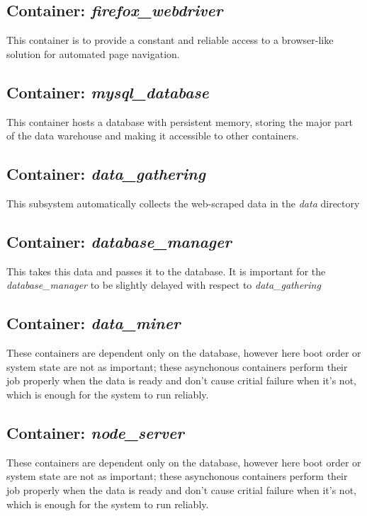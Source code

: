 \subsection{Container: \textit{firefox\_webdriver}}
This container is to provide a constant and reliable access to a browser-like solution for automated page navigation.

\subsection{Container: \textit{mysql\_database}}
This container hosts a database with persistent memory, storing the major part of the data warehouse and making it accessible to other containers.

\subsection{Container: \textit{data\_gathering}}
This subsystem automatically collects the web-scraped data in the \textit{data} directory

\subsection{Container: \textit{database\_manager}}
This takes this data and passes it to the database. It is important for the \textit{database\_manager} to be slightly delayed with respect to \textit{data\_gathering}

\subsection{Container: \textit{data\_miner}}
These containers are dependent only on the database, however here boot order or system state are not as important; these asynchonous containers perform their job properly when the data is ready and don't cause critial failure when it's not, which is enough for the system to run reliably.

\subsection{Container: \textit{node\_server}}
These containers are dependent only on the database, however here boot order or system state are not as important; these asynchonous containers perform their job properly when the data is ready and don't cause critial failure when it's not, which is enough for the system to run reliably.

